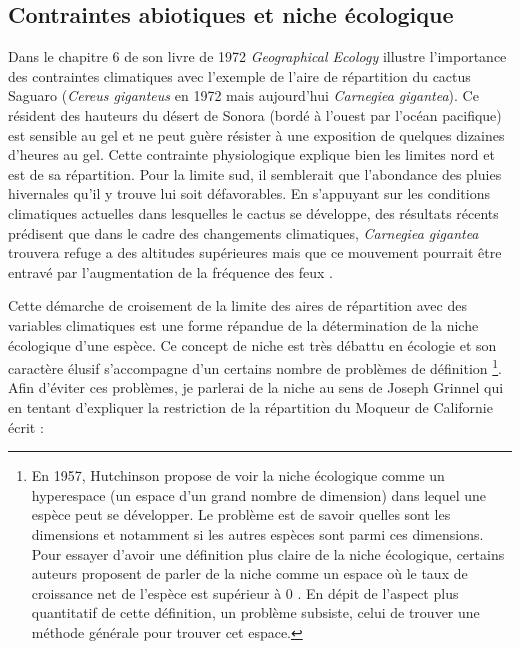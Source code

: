 \subsection*{Contraintes abiotiques et niche
écologique}\label{contraintes-abiotiques-et-niche-uxe9cologique}

Dans le chapitre 6 de son livre de 1972 \emph{Geographical Ecology}
\citet{macarthur1972geographical} illustre l'importance des contraintes
climatiques avec l'exemple de l'aire de répartition du cactus Saguaro
(\emph{Cereus giganteus} en 1972 mais aujourd'hui \emph{Carnegiea
gigantea}). Ce résident des hauteurs du désert de Sonora (bordé à
l'ouest par l'océan pacifique) est sensible au gel et ne peut guère
résister à une exposition de quelques dizaines d'heures au gel. Cette
contrainte physiologique explique bien les limites nord et est de sa
répartition. Pour la limite sud, il semblerait que l'abondance des
pluies hivernales qu'il y trouve lui soit défavorables. En s'appuyant
sur les conditions climatiques actuelles dans lesquelles le cactus se
développe, des résultats récents prédisent que dans le cadre des
changements climatiques, \emph{Carnegiea gigantea} trouvera refuge a des
altitudes supérieures mais que ce mouvement pourrait être entravé par
l'augmentation de la fréquence des feux \citep{Springer2015}.

Cette démarche de croisement de la limite des aires de répartition avec
des variables climatiques est une forme répandue de la détermination de
la niche écologique d'une espèce. Ce concept de niche est très débattu
en écologie et son caractère élusif s'accompagne d'un certains nombre de
problèmes de définition \footnote{En 1957, Hutchinson propose de voir la
  niche écologique comme un hyperespace (un espace d'un grand nombre de
  dimension) dans lequel une espèce peut se développer. Le problème est
  de savoir quelles sont les dimensions et notamment si les autres
  espèces sont parmi ces dimensions. Pour essayer d'avoir une définition
  plus claire de la niche écologique, certains auteurs proposent de
  parler de la niche comme un espace où le taux de croissance net de
  l'espèce est supérieur à 0 \citep{Chase2003}. En dépit de l'aspect
  plus quantitatif de cette définition, un problème subsiste, celui de
  trouver une méthode générale pour trouver cet espace.}. Afin d'éviter
ces problèmes, je parlerai de la niche au sens de Joseph Grinnel qui en
tentant d'expliquer la restriction de la répartition du Moqueur de
Californie écrit :

